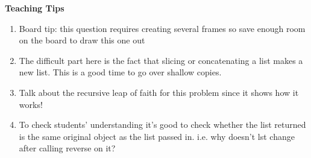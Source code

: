 \begin{blocksection}
	\begin{guide}
	\textbf{Teaching Tips}
	\begin{enumerate}
			\item Board tip: this question requires creating several frames so save enough room on the board to draw this one out 
            \item The difficult part here is the fact that slicing or concatenating a list makes a new list. This is a good time to go over shallow copies.
            \item Talk about the recursive leap of faith for this problem since it shows how it works!
            \item To check students’ understanding it’s good to check whether the list returned is the same original object as the list passed in. i.e. why doesn’t lst change after calling reverse on it?
	\end{enumerate}
	\end{guide}
\end{blocksection}